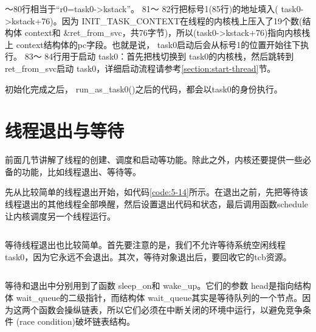 \documentclass[main.tex]{subfiles}
\begin{document}
\begin{CJK*}{UTF8}{song}
～80行相当于“r0=task0-\textgreater kstack”。 81～ 82行把标号1(85行)的地址填入( task0-\textgreater kstack+76)。因为 INIT\_\-TASK\_\-CONTEXT在线程的内核栈上压入了19个数(结构体 context和 \&ret\_\-from\_\-svc，共76字节)，所以(task0-\textgreater kstack+76)指向内核栈上 context结构体的pc字段。也就是说， task0启动后会从标号1的位置开始往下执行。 83～ 84行用于启动 task0：首先把栈切换到 task0的内核栈，然后跳转到 ret\_\-from\_\-svc启动 task0，详细启动流程请参考\ref{section:start-thread}节。

\par
初始化完成之后， run\_\-as\_\-task0()之后的代码，都会以task0的身份执行。

\section{线程退出与等待}
前面几节讲解了线程的创建、调度和启动等功能。除此之外，内核还要提供一些必备的功能，比如线程退出、等待等。

\par
先从比较简单的线程退出开始，如代码\ref{code:5-14}所示。在退出之前，先把等待该线程退出的其他线程全部唤醒，然后设置退出代码和状态，最后调用函数schedule让内核调度另一个线程运行。

\begin{code}
\label{code:5-14}
\inputminted[firstline=205,lastline=222,linenos,numbersep=5pt,frame=lines,framesep=2mm]{c}{src/chapter05/kernel/task.c}
\end{code}

等待线程退出也比较简单。首先要注意的是，我们不允许等待系统空闲线程task0，因为它永远不会退出。其次，等待对象退出后，要回收它的tcb资源。

\begin{code}
\label{code:5-15}
\inputminted[firstline=224,lastline=265,linenos,numbersep=5pt,frame=lines,framesep=2mm]{c}{src/chapter05/kernel/task.c}
\end{code}

等待和退出中分别用到了函数 sleep\_\-on和 wake\_\-up。它们的参数 head是指向结构体 wait\_\-queue的二级指针，而结构体 wait\_\-queue其实是等待队列的一个节点。因为这两个函数会操纵链表，所以它们必须在中断关闭的环境中运行，以避免竞争条件 (race condition)破坏链表结构。

\begin{code}
\label{code:5-16}
\inputminted[firstline=120,lastline=123,linenos,numbersep=5pt,frame=lines,framesep=2mm]{c}{src/chapter05/kernel/kernel.h}
\end{code}


\end{CJK*}
\end{document}
